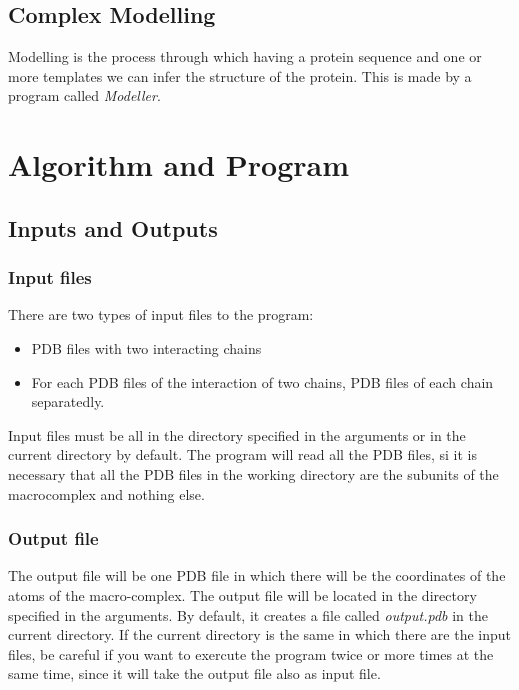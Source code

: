 \documentclass[a4paper,12pt]{report}
\begin{document}
\section{Complex Modelling}

Modelling is the process through which having a protein sequence and one or more templates we can infer the structure of the protein. This is made by a program called \textit{Modeller}. 



\chapter{Algorithm and Program}


\section{Inputs and Outputs}

\subsection{Input files}

There are two types of input files to the program:

\begin{itemize}
 \item PDB files with two interacting chains
 \item For each PDB files of the interaction of two chains, PDB files of each chain separatedly.
\end{itemize}

Input files must be all in the directory specified in the arguments or in the current directory by default. The program will read all the PDB files, si it is necessary that all the PDB files in the working directory are the subunits of the macrocomplex and nothing else.

\subsection{Output file}

The output file will be one PDB file in which there will be the coordinates of the atoms of the macro-complex. The output file will be located in the directory specified in the arguments. By default, it creates a file called \textit{output.pdb} in the current directory. If the current directory is the same in which there are the input files, be careful if you want to exercute the program twice or more times at the same time, since it will take the output file also as input file.
\end{document}
